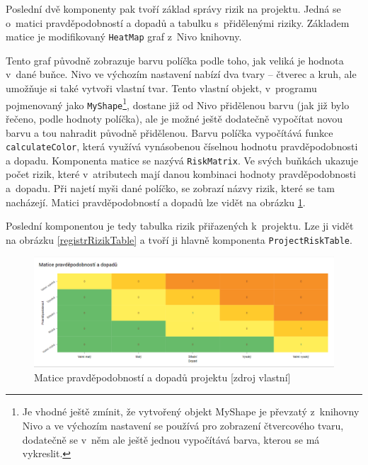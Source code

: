 Poslední dvě komponenty pak tvoří základ správy rizik na projektu. Jedná se o~matici pravděpodobností a dopadů a tabulku s~přidělenými riziky. Základem matice je modifikovaný \texttt{HeatMap} graf z~Nivo knihovny.

Tento graf původně zobrazuje barvu políčka podle toho, jak veliká je hodnota v~dané buňce. Nivo ve výchozím nastavení nabízí dva tvary – čtverec a kruh, ale umožňuje si také vytvoři vlastní tvar. Tento vlastní objekt, v~programu pojmenovaný jako \texttt{MyShape}\footnote{Je vhodné ještě zmínit, že vytvořený objekt MyShape je převzatý z~knihovny Nivo a ve výchozím nastavení se používá pro zobrazení čtvercového tvaru, dodatečně se v~něm ale ještě jednou vypočítává barva, kterou se má vykreslit.}, dostane již od Nivo přidělenou barvu (jak již bylo řečeno, podle hodnoty políčka), ale je možné ještě dodatečně vypočítat novou barvu a tou nahradit původně přidělenou. Barvu políčka vypočítává funkce \texttt{calculateColor}, která využívá vynásobenou číselnou hodnotu pravděpodobnosti a dopadu. Komponenta matice se nazývá \texttt{RiskMatrix}. Ve svých buňkách ukazuje počet rizik, které v~atributech mají danou kombinaci hodnoty pravděpodobnosti a~dopadu. Při najetí myši dané políčko, se zobrazí názvy rizik, které se tam nacházejí. Matici pravděpodobností a dopadů lze vidět na obrázku \ref{maticePravdDopad}.

    
Poslední komponentou je tedy tabulka rizik přiřazených k~projektu. Lze ji vidět na obrázku \ref{registrRizikTable} a tvoří ji hlavně komponenta \texttt{ProjectRiskTable}.


    \begin{figure}[!htbp]
    \begin{center}
    \includegraphics[scale=0.7, angle=90]{obrazky-figures/maticePravdDopad.png}
    \caption{Matice pravděpodobností a dopadů projektu [zdroj vlastní]}
    \label{maticePravdDopad}
    \end{center}
    \end{figure}

